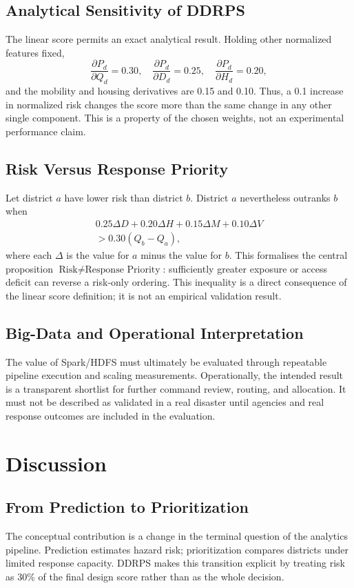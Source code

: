 \documentclass[conference]{IEEEtran}
\begin{document}
\subsection{Analytical Sensitivity of DDRPS}
The linear score permits an exact analytical result. Holding other
normalized features fixed,
\begin{equation}
\frac{\partial P_d}{\partial Q_d}=0.30,\quad
\frac{\partial P_d}{\partial D_d}=0.25,\quad
\frac{\partial P_d}{\partial H_d}=0.20,
\end{equation}
and the mobility and housing derivatives are 0.15 and 0.10. Thus, a
0.1 increase in normalized risk changes the score more than the same
change in any other single component. This is a property of the chosen
weights, not an experimental performance claim.

\subsection{Risk Versus Response Priority}
Let district $a$ have lower risk than district $b$. District $a$ nevertheless
outranks $b$ when
\begin{multline}
0.25\Delta D+0.20\Delta H+0.15\Delta M+0.10\Delta V\\
>0.30(Q_b-Q_a),
\end{multline}
where each $\Delta$ is the value for $a$ minus the value for $b$. This
formalises the central proposition $\text{Risk}\neq\text{Response Priority}$:
sufficiently greater exposure or access deficit can reverse a risk-only ordering.
This inequality is a direct consequence of the linear score definition; it is
not an empirical validation result.

\subsection{Big-Data and Operational Interpretation}
The value of Spark/HDFS must ultimately be evaluated through repeatable pipeline
execution and scaling measurements. Operationally, the intended result is a
transparent shortlist for further command review, routing, and allocation. It
must not be described as validated in a real disaster until agencies and real
response outcomes are included in the evaluation.

\section{Discussion}

\subsection{From Prediction to Prioritization}
The conceptual contribution is a change in the terminal question of the
analytics pipeline. Prediction estimates hazard risk; prioritization compares
districts under limited response capacity. DDRPS makes this transition explicit
by treating risk as 30\% of the final design score rather than as the whole
decision.
\end{document}
